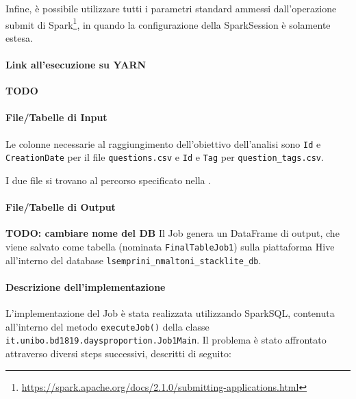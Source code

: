   Infine, è possibile utilizzare tutti i parametri standard ammessi dall'operazione submit di Spark\footnote{\url{https://spark.apache.org/docs/2.1.0/submitting-applications.html}},
  in quando la configurazione della SparkSession è solamente estesa.

  \paragraph{Link all'esecuzione su YARN}\label{par:job1:spark:yarn}

  \textbf{TODO}

  \paragraph{File/Tabelle di Input}\label{par:job1:spark:input}

  Le colonne necessarie al raggiungimento dell'obiettivo dell'analisi sono \texttt{Id} e \texttt{CreationDate} per il file \texttt{questions.csv}
  e \texttt{Id} e \texttt{Tag} per \texttt{question\_tags.csv}.

  I due file si trovano al percorso specificato nella .

  \paragraph{File/Tabelle di Output}\label{par:job1:spark:output}
  \textbf{TODO: cambiare nome del DB}
  Il Job genera un DataFrame di output, che viene salvato come tabella (nominata \texttt{FinalTableJob1})
  sulla piattaforma Hive all'interno del database \texttt{lsemprini\_nmaltoni\_stacklite\_db}.

  \paragraph{Descrizione dell'implementazione}\label{par:job1:spark:implementation}

  L'implementazione del Job è stata realizzata utilizzando SparkSQL, contenuta all'interno del metodo \texttt{executeJob()}
  della classe \texttt{it.unibo.bd1819.daysproportion.Job1Main}.
  Il problema è stato affrontato attraverso diversi steps successivi, descritti di seguito:

